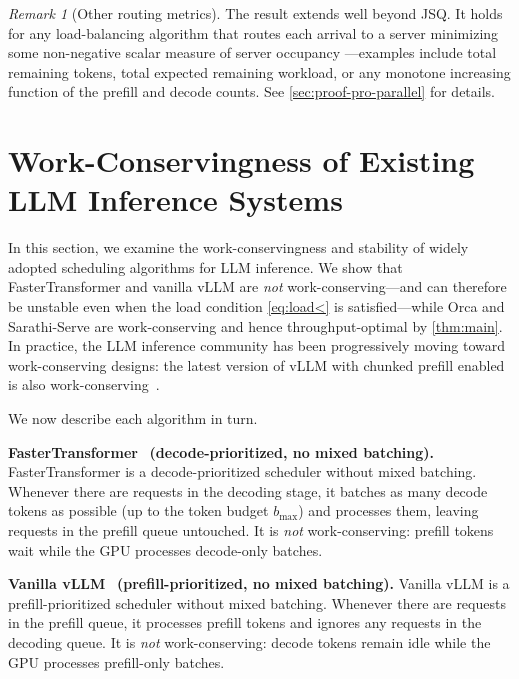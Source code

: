 \documentclass[11pt]{article}
\theoremstyle{plain}
\theoremstyle{definition}
\theoremstyle{remark}
\newtheorem{remark}[theorem]{Remark}
\begin{document}
\begin{remark}[Other routing metrics]
\label{rem:jsq+}
The result extends well beyond JSQ. It holds for any load-balancing algorithm that routes each arrival to a server minimizing some non-negative scalar measure of server occupancy ---examples include total remaining tokens, total expected remaining workload, or any monotone increasing function of the prefill and decode counts. See \cref{sec:proof-pro-parallel} for details.
\end{remark}



\section{Work-Conservingness of Existing LLM Inference Systems}
\label{sec:incumbent}

In this section, we examine the work-conservingness and stability of widely adopted scheduling algorithms for LLM inference. We show that FasterTransformer and vanilla vLLM are \emph{not} work-conserving---and can therefore be unstable even when the load condition \cref{eq:load<} is satisfied---while Orca and Sarathi-Serve are work-conserving and hence throughput-optimal by \cref{thm:main}. In practice, the LLM inference community has been progressively moving toward work-conserving designs: the latest version of vLLM with chunked prefill enabled is also work-conserving~\citep{vllm2025chunked}.

We now describe each algorithm in turn.

\textbf{FasterTransformer}~\citep{fastertransformer} \textbf{(decode-prioritized, no mixed batching).}
FasterTransformer is a decode-prioritized scheduler without mixed batching. Whenever there are requests in the decoding stage, it batches as many decode tokens as possible (up to the token budget $b_{\max}$) and processes them, leaving requests in the prefill queue untouched. It is \emph{not} work-conserving: prefill tokens wait while the GPU processes decode-only batches.

\textbf{Vanilla vLLM}~\citep{kwon2023efficient} \textbf{(prefill-prioritized, no mixed batching).}
Vanilla vLLM is a prefill-prioritized scheduler without mixed batching. Whenever there are requests in the prefill queue, it processes prefill tokens and ignores any requests in the decoding queue. It is \emph{not} work-conserving: decode tokens remain idle while the GPU processes prefill-only batches.
\end{document}

